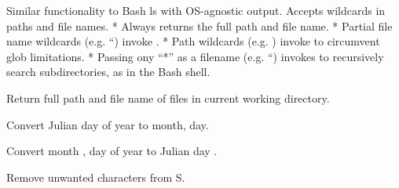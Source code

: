 \documentclass[letterpaper,11pt,english]{sphinxmanual}
\begin{document}
\begin{fulllineitems}
\label{\detokenize{src/Appendices/function_list:ls}}
\end{fulllineitems}


Similar functionality to Bash ls with OS-agnostic output. Accepts wildcards in paths and file names.
* Always returns the full path and file name.
* Partial file name wildcards (e.g. “) invoke .
* Path wildcards (e.g. ) invoke  to circumvent glob limitations.
* Passing ony “*” as a filename (e.g. “) invokes  to recursively search subdirectories, as in the Bash shell.

\begin{fulllineitems}
\end{fulllineitems}


Return full path and file name of files in current working directory.

\begin{fulllineitems}
\label{\detokenize{src/Appendices/function_list:j2md}}
\end{fulllineitems}


Convert Julian day  of year  to month, day.

\begin{fulllineitems}
\label{\detokenize{src/Appendices/function_list:md2j}}
\end{fulllineitems}


Convert month , day  of year  to Julian day .

Remove unwanted characters from S.

\begin{fulllineitems}
\label{\detokenize{src/Appendices/function_list:parsetimewin}}
\end{fulllineitems}
\end{document}

